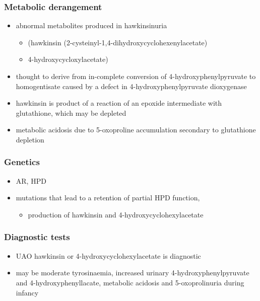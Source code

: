 \documentclass{scrartcl}
\begin{document}
\subsubsection{Metabolic derangement}
\label{sec:orgf25b922}
\begin{itemize}
\item abnormal metabolites produced in hawkinsinuria
\begin{itemize}
\item (hawkinsin (2-cysteinyl-1,4-dihydroxycyclohexenylacetate)
\item 4-hydroxycycloxylacetate)
\end{itemize}
\item thought to derive from in-complete conversion of
4-hydroxyphenylpyruvate to homogentisate caused by a defect in
4-hydroxyphenylpyruvate dioxygenase
\end{itemize}
\begin{itemize}
\item hawkinsin is product of a reaction of an epoxide intermediate with
glutathione, which may be depleted
\item metabolic acidosis due to 5-oxoproline accumulation secondary to
glutathione depletion
\end{itemize}

\subsubsection{Genetics}
\label{sec:org33356b5}
\begin{itemize}
\item AR, HPD
\item mutations that lead to a retention of partial HPD function,
\begin{itemize}
\item production of hawkinsin and 4-hydroxycyclohexylacetate
\end{itemize}
\end{itemize}
\subsubsection{Diagnostic tests}
\label{sec:org54c38de}
\begin{itemize}
\item UAO hawkinsin or 4-hydroxycyclohexylacetate is diagnostic
\item may be moderate tyrosinaemia, increased urinary
4-hydroxyphenylpyruvate and 4-hydroxyphenyllacate, metabolic
acidosis and 5-oxoprolinuria during infancy
\end{itemize}
\end{document}
